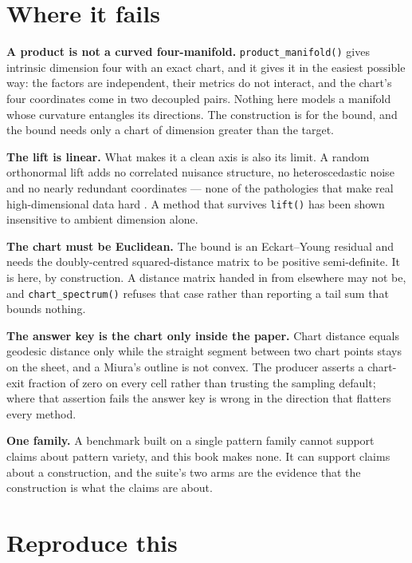 \documentclass[
  british,
  a4paper,
]{book}
\newcounter{none} %
\begin{document}
\section{Where it fails}\label{bench-limits}

\textbf{A product is not a curved four-manifold.} \texttt{product\_manifold()} gives
intrinsic dimension four with an exact chart, and it gives it in the easiest
possible way: the factors are independent, their metrics do not interact, and
the chart's four coordinates come in two decoupled pairs. Nothing here models a
manifold whose curvature entangles its directions. The construction is for the
bound, and the bound needs only a chart of dimension greater than the target.

\textbf{The lift is linear.} What makes it a clean axis is also its limit. A random
orthonormal lift adds no correlated nuisance structure, no heteroscedastic noise
and no nearly redundant coordinates --- none of the pathologies that make real
high-dimensional data hard \citep{chari2023specious, lause2024elephant}. A method
that survives \texttt{lift()} has been shown insensitive to ambient dimension alone.

\textbf{The chart must be Euclidean.} The bound is an Eckart--Young residual and
needs the doubly-centred squared-distance matrix to be positive semi-definite.
It is here, by construction. A distance matrix handed in from elsewhere may not
be, and \texttt{chart\_spectrum()} refuses that case rather than reporting a tail sum
that bounds nothing.

\textbf{The answer key is the chart only inside the paper.} Chart distance equals
geodesic distance only while the straight segment between two chart points stays
on the sheet, and a Miura's outline is not convex. The producer asserts a
chart-exit fraction of zero on every cell rather than trusting the sampling
default; where that assertion fails the answer key is wrong in the direction
that flatters every method.

\textbf{One family.} A benchmark built on a single pattern family cannot support
claims about pattern variety, and this book makes none. It can support claims
about a construction, and the suite's two arms are the evidence that the
construction is what the claims are about.

\section{Reproduce this}\label{bench-reproduce}
\end{document}
